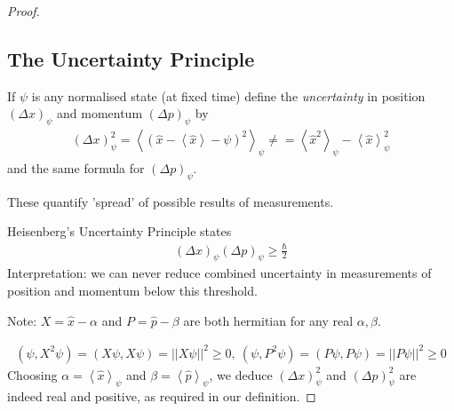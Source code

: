 \documentclass[a4paper]{article}
\begin{document}
\begin{proof}
\subsection{The Uncertainty Principle}
If $\psi$ is any normalised state (at fixed time) define the \emph{uncertainty} in position $\left(\Delta x\right)_\psi$ and momentum $\left(\Delta p\right)_\psi$ by
\begin{equation*}
\begin{aligned}
\left(\Delta x\right)_\psi^2 = \left<\left(\hat{x}-\left<\hat{x}\right>-\psi\right)^2\right>_\psi \neq = \left<\hat{x}^2\right>_\psi - \left<\hat{x}\right>_\psi^2
\end{aligned}
\end{equation*}
and the same formula for $\left(\Delta p\right)_\psi$.

These quantify 'spread' of possible results of measurements.

Heisenberg's Uncertainty Principle states
\begin{equation*}
\begin{aligned}
\left(\Delta x\right)_\psi \left(\Delta p\right)_\psi \geq \frac{\hbar}{2}
\end{aligned}
\end{equation*}
Interpretation: we can never reduce combined uncertainty in measurements of position and momentum below this threshold.

Note: $X=\hat{x}-\alpha$ and $P=\hat{p}-\beta$ are both hermitian for any real $\alpha,\beta$.

\begin{equation*}
\begin{aligned}
\left(\psi,X^2\psi\right) = \left(X\psi,X\psi\right) = ||X\psi||^2 \geq 0,\
\left(\psi,P^2\psi\right) = \left(P\psi,P\psi\right) = ||P\psi||^2 \geq 0
\end{aligned}
\end{equation*}
Choosing $\alpha = \left<\hat{x}\right>_\psi$ and $\beta = \left<\hat{p}\right>_\psi$, we deduce $\left(\Delta x\right)_\psi^2$ and $\left(\Delta p\right)_\psi^2$ are indeed real and positive, as required in our definition.


\end{proof}
\end{document}
